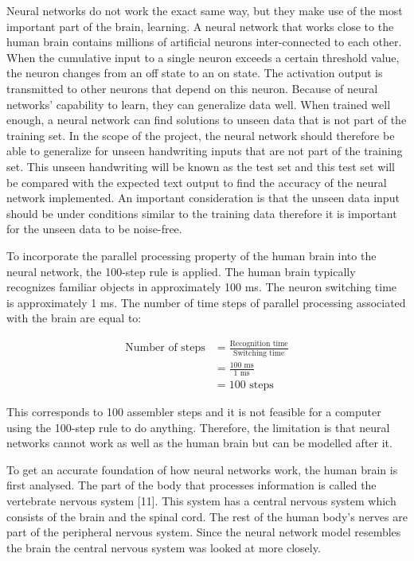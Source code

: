 Neural networks do not work the exact same way, but they make use of the most important part of the brain, learning. A neural network that works close to the human brain contains millions of artificial neurons inter-connected to each other. When the cumulative input to a single neuron exceeds a certain threshold value, the neuron changes from an off state to an on state. The activation output is transmitted to other neurons that depend on this neuron. Because of neural networks’ capability to learn, they can generalize data well. When trained well enough, a neural network can find solutions to unseen data that is not part of the training set. In the scope of the project, the neural network should therefore be able to generalize for unseen handwriting inputs that are not part of the training set. This unseen handwriting will be known as the test set and this test set will be compared with the expected text output to find the accuracy of the neural network implemented. An important consideration is that the unseen data input should be under conditions similar to the training data therefore it is important for the unseen data to be noise-free. 

To incorporate the parallel processing property of the human brain into the neural network, the 100-step rule is applied. The human brain typically recognizes familiar objects in approximately 100 ms. The neuron switching time is approximately 1 ms. The number of time steps of parallel processing associated with the brain are equal to:

\begin{align*}
	\text{Number of steps} &=  \frac{\text{Recognition time}}{\text{Switching time}}\\
	 &=  \frac{100\text{ ms}}{1\text{ ms}}\\
	 &= 100 \text{ steps}
\end{align*}

	This corresponds to 100 assembler steps and it is not feasible for a computer using the 100-step rule to do anything. Therefore, the limitation is that neural networks cannot work as well as the human brain but can be modelled after it.

To get an accurate foundation of how neural networks work, the human brain is first analysed. The part of the body that processes information is called the vertebrate nervous system [11]. This system has a central nervous system which consists of the brain and the spinal cord. The rest of the human body’s nerves are part of the peripheral nervous system. Since the neural network model resembles the brain the central nervous system was looked at more closely.


